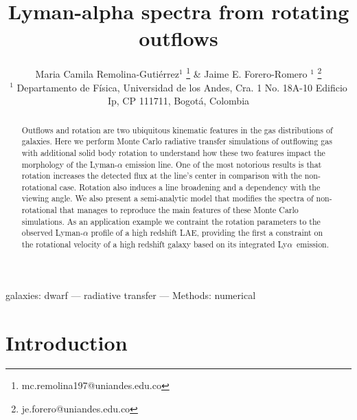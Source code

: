\documentclass[a4paper,fleqn,usenatbib]{mnras}
\newcommand{\lya}{\ifmmode{{\rm Ly}\alpha}\else Ly$\alpha$\ \fi}
\begin{document}
\title[Outflows and rotation in LAEs]{Lyman-alpha spectra from
  rotating outflows} 
\author[M.C. Remolina-Gutierrez \& J.E. Forero-Romero]{
  Maria Camila Remolina-Guti\'errez$^{1}$ 
  \thanks{mc.remolina197@uniandes.edu.co} \&
  Jaime E. Forero-Romero $^{1}$ 
  \thanks{je.forero@uniandes.edu.co}\\
  $^{1}$ Departamento de F\'isica, Universidad de los Andes, Cra. 1
  No. 18A-10 Edificio Ip, CP 111711, Bogot\'a, Colombia \\
}

\maketitle
      
\begin{abstract}
Outflows and rotation are two ubiquitous kinematic features in the gas
distributions of galaxies.
Here we perform Monte Carlo radiative transfer simulations of outflowing
gas with additional solid body rotation to understand how these two
features impact the morphology of the Lyman-$\alpha$ emission line.
One of the most notorious results is that rotation increases the
detected flux at the line's center in comparison with the
non-rotational case. 
Rotation also induces a line broadening and a dependency with the
viewing angle.
We also present a semi-analytic model that modifies the spectra of
non-rotational that manages to reproduce the main features of these
Monte Carlo simulations. 
As an application example we contraint the rotation parameters to the
observed Lyman-$\alpha$ profile of a high redshift LAE, providing the
first a constraint on the rotational velocity of a high redshift
galaxy based on its integrated \lya emission.
\end{abstract}

\begin{keywords}
galaxies: dwarf --- radiative transfer --- Methods: numerical 
\end{keywords}




\section{Introduction}
\label{sec:intro}
\end{document}
